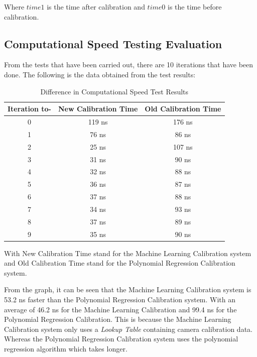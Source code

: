 Where $time1$ is the time after calibration and $time0$ is the time before calibration.

\subsection{Computational Speed Testing Evaluation}
\label{sec:31}

From the tests that have been carried out, there are 10 iterations that have been done. The following is the data obtained from the test results:

\begin{table}[htpb]
  \caption{Difference in Computational Speed Test Results}
\begin{center}

\begin{tabular}{|c|c|c|}
  \hline
  \rowcolor[HTML]{C0C0C0}
  \textbf{Iteration to-} & \textbf{New Calibration Time} & \textbf{Old Calibration Time} \\
  \hline
  0            & 119 ns                & 176 ns            \\
  1           & 76 ns                & 86 ns            \\
  2           & 25 ns                & 107 ns            \\
  3           & 31 ns                & 90 ns           \\
  4           & 32 ns                & 88 ns           \\
  5           & 36 ns                & 87 ns           \\
  6           & 37 ns                & 88 ns           \\
  7           & 34 ns                & 93 ns           \\
  8           & 37 ns                & 89 ns           \\
  9           & 35 ns                & 90 ns           \\
  \hline
\end{tabular}
\end{center}
\end{table}

With New Calibration Time stand for the Machine Learning Calibration system and Old Calibration Time stand for the Polynomial Regression Calibration system.

From the graph, it can be seen that the Machine Learning Calibration system is 53.2 ns faster than the Polynomial Regression Calibration system. With an average of 46.2 ns for the Machine Learning Calibration and 99.4 ns for the Polynomial Regression Calibration. This is because the Machine Learning Calibration system only uses a \emph{Lookup Table} containing camera calibration data. Whereas the Polynomial Regression Calibration system uses the polynomial regression algorithm which takes longer.


